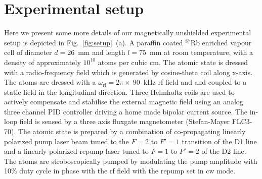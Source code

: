 \documentclass[%
reprint,
 amsmath,amssymb,
 aps,
floatfix,
]{revtex4-1}
\begin{document}
\section{Experimental setup \label{Sup:exp_setup}}
Here we present some more details of our magnetically unshielded experimental setup is depicted in Fig.~\ref{fig:setup}~(a). 
A paraffin coated $^{87}$Rb enriched vapour cell {\color{black}of diameter} $d=26$~mm and {\color{black}length} $l=75$~mm at room temperature, with a density of approximately $10^{10}$ atoms per cubic cm. The atomic state is dressed with a radio-frequency field which is generated by cosine-theta coil along x-axis. The atoms are dressed with a $\omega_\mathrm{rf}=2\pi\times~90$~kHz rf field and and coupled to a static field in the longitudinal direction. Three Helmholtz coils are used to actively compensate and stabilise the external magnetic field using an analog three channel PID controller driving a home made bipolar current source. The in-loop field is sensed by a three axis fluxgate magnetometer (Stefan-Mayer FLC3-70). The atomic state is prepared by a combination of co-propagating linearly polarized pump laser beam tuned to the $F=2$ to $F'=1$ transition of the D1 line and a linearly polarized repump laser tuned to $F=1$ to $F'=2$ of the D2 line. The atoms are stroboscopically pumped by modulating the pump amplitude with 10\% duty cycle in phase with the rf field with the repump set in cw mode.

\end{document}
